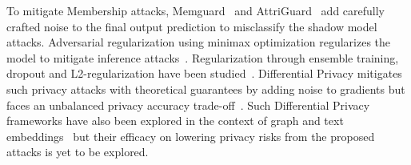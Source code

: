 To mitigate Membership attacks, Memguard~\cite{memguard} and AttriGuard~\cite{attriguard} add carefully crafted noise to the final output prediction to misclassify the shadow model attacks.
Adversarial regularization using minimax optimization regularizes the model to mitigate inference attacks~\cite{advreg}.
Regularization through ensemble training, dropout and L2-regularization have been studied~\cite{ndss19salem}.
Differential Privacy mitigates such privacy attacks with theoretical guarantees by adding noise to gradients but faces an unbalanced privacy accuracy trade-off~\cite{diffpriv}.
Such Differential Privacy frameworks have also been explored in the context of graph and text embeddings~\cite{dptext,dpne} but their efficacy on lowering privacy risks from the proposed attacks is yet to be explored.
